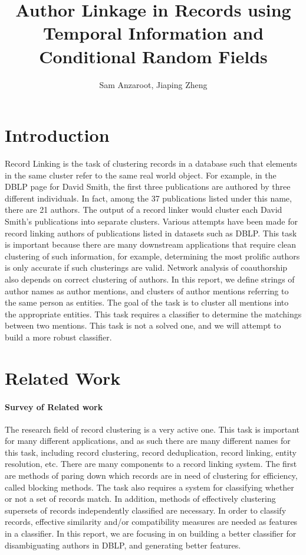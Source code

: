 \documentclass[twocolumn,letterpaper]{article}
\title{Author Linkage in Records using Temporal Information and Conditional Random Fields}
\author{Sam Anzaroot, Jiaping Zheng}
\date{}
\begin{document}
\ifpdf
{}
\else
{}
\fi

\maketitle

\section{Introduction} %
\label{sec:introduction}
Record Linking is the task of clustering records in a database such that elements in the same cluster refer to the same real world object. For example, in the DBLP page for David Smith, the first three publications are authored by three different individuals.  In fact, among the 37 publications listed under this name, there are 21 authors.  The output of a record linker would cluster each David Smith's publications into separate clusters. Various attempts have been made for record linking authors of publications listed in datasets such as DBLP. This task is important because there are many downstream applications that require clean clustering of such information, for example, determining the most prolific authors is only accurate if such clusterings are valid. Network analysis of coauthorship also depends on correct clustering of authors. In this report, we define strings of author names as author mentions, and clusters of author mentions referring to the same person as entities. The goal of the task is to cluster all mentions into the appropriate entities. This task requires a classifier to determine the matchings between two mentions. This task is not a solved one, and we will attempt to build a more robust classifier.

\section{Related Work} %
\label{sec:related_work}
\paragraph{Survey of Related work} %
\label{par:survey_of_related_work}
The research field of record clustering is a very active one. This task is important for many different applications, and as such there are many different names for this task, including record clustering, record deduplication, record linking, entity resolution, etc. There are many components to a record linking system. The first are methods of paring down which records are in need of clustering for efficiency, called blocking methods. The task also requires a system for classifying whether or not a set of records match. In addition, methods of effectively clustering supersets of records independently classified are necessary. In order to classify records, effective similarity and/or compatibility measures are needed as features in a classifier. In this report, we are focusing in on building a better classifier for disambiguating authors in DBLP, and generating better features.
\end{document}
